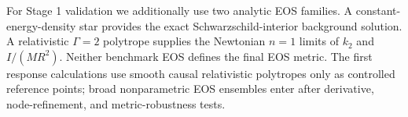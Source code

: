 For Stage 1 validation we additionally use two analytic EOS families. A
constant-energy-density star provides the exact Schwarzschild-interior
background solution. A relativistic \(\Gamma=2\) polytrope supplies the
Newtonian \(n=1\) limits of \(k_2\) and \(I/(MR^2)\). Neither benchmark EOS
defines the final EOS metric. The first response calculations use smooth
causal relativistic polytropes only as controlled reference points; broad
nonparametric EOS ensembles enter after derivative, node-refinement, and
metric-robustness tests.
